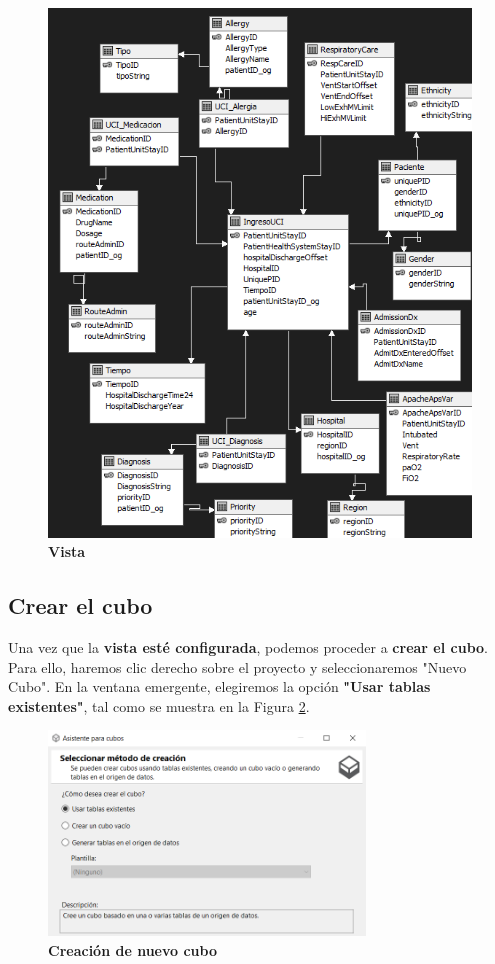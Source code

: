 \documentclass[12pt, a4paper, twoside]{article}
\begin{document}
\begin{figure}[H]
	\centering
	\includegraphics[width=1\textwidth]{image/vista_origenes_datos}
	\caption{\textbf{Vista}}
	\label{fig:7}
\end{figure}

\subsection{\textbf{Crear el cubo}}

Una vez que la \textbf{vista esté configurada}, podemos proceder a \textbf{crear el cubo}. Para ello, haremos clic derecho sobre el proyecto y seleccionaremos "Nuevo Cubo". En la ventana emergente, elegiremos la opción \textbf{"Usar tablas existentes"}, tal como se muestra en la Figura \ref{fig:9}.

\begin{figure}[H]
	\centering
	\includegraphics[width=0.75\textwidth]{image/crearCubo}
	\caption{\textbf{Creación de nuevo cubo}}
	\label{fig:9}
\end{figure}
\end{document}
